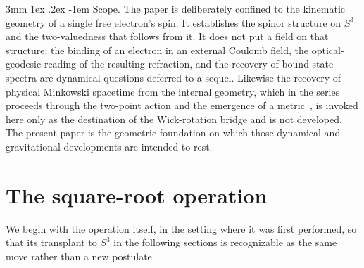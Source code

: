 \documentclass[%
 reprint, amsmath,amssymb, aps, prb, ]{revtex4-2}
\makeatletter
\numberwithin{equation}{section}
\renewcommand\paragraph{%
  \@startsection{paragraph}{4}{\z@}%
    {3mm \@plus 1ex \@minus .2ex}%
    {-1em}%
    {\normalfont\normalsize\itshape}}
\makeatother
\begin{document}
\paragraph{Scope.}
The paper is deliberately confined to the kinematic geometry of a single free electron's spin. It establishes the spinor structure on $S^{3}$ and the two-valuedness that follows from it. It does not put a field on that structure: the binding of an electron in an external Coulomb field, the optical-geodesic reading of the resulting refraction, and the recovery of bound-state spectra are dynamical questions deferred to a sequel. Likewise the recovery of physical Minkowski spacetime from the internal geometry, which in the series proceeds through the two-point action and the emergence of a metric~\cite{hanamura51,hanamura63}, is invoked here only as the destination of the Wick-rotation bridge and is not developed. The present paper is the geometric foundation on which those dynamical and gravitational developments are intended to rest.

\section{The square-root operation}
\label{sec:sqrt}

We begin with the operation itself, in the setting where it was first performed, so that its transplant to $S^{3}$ in the following sections is recognizable as the same move rather than a new postulate.
\end{document}
